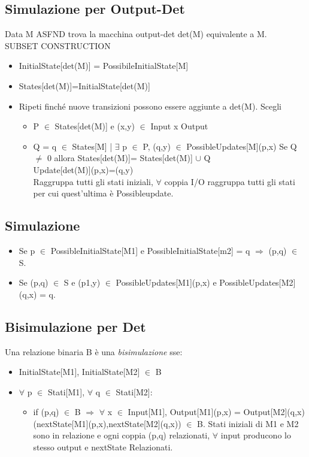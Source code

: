 \documentclass[a4paper]{article}
\begin{document}
\subsection{Simulazione per Output-Det}Data M ASFND trova la macchina output-det det(M) equivalente a M.\\ SUBSET CONSTRUCTION 
\begin{itemize}
\item InitialState[det(M)] = PossibileInitialState[M]
\item States[det(M)]={InitialState[det(M)]}
\item Ripeti finché nuove transizioni possono essere aggiunte a det(M). Scegli
\begin{itemize}
\item P $\in$ States[det(M)] e (x,y) $\in$ Input x Output
\item Q = {q $\in$ States[M] | $\exists$ p $\in$ P, (q,y) $\in$ PossibleUpdates[M](p,x)}
Se Q $\ne$ 0 allora States[det(M)]= States[det(M)] $\cup$ {Q}\\
Update[det(M)](p,x)=(q,y)\\
Raggruppa tutti gli stati iniziali, $\forall$ coppia I/O raggruppa tutti gli stati per cui quest'ultima è Possibleupdate.
\end{itemize}
\end{itemize}
\subsection{Simulazione}
\begin{itemize}
\item Se p $\in$ PossibleInitialState[M1] e PossibleInitialState[m2] = {q} $\Rightarrow$ (p,q) $\in$ S.
\item Se (p,q) $\in$ S e (p1,y) $\in$ PossibleUpdates[M1](p,x) e PossibleUpdates[M2](q,x) = {q}. 
\end{itemize}
\subsection{Bisimulazione per Det} Una relazione binaria B è una \emph{bisimulazione} sse:
\begin{itemize}
\item InitialState[M1], InitialState[M2] $\in$ B 
\item $\forall$ p $\in$ Stati[M1], $\forall$ q $\in$ Stati[M2]:
\begin{itemize}
\item if (p,q) $\in$ B $\Rightarrow$ $\forall$ x $\in$ Input[M1], Output[M1](p,x) = Output[M2](q,x)\\
(nextState[M1](p,x),nextState[M2](q,x)) $\in$ B.
Stati iniziali di M1 e M2 sono in relazione e ogni coppia (p,q) relazionati, $\forall$ input producono lo stesso output e nextState Relazionati.
\end{itemize}
\end{itemize}
\end{document}
